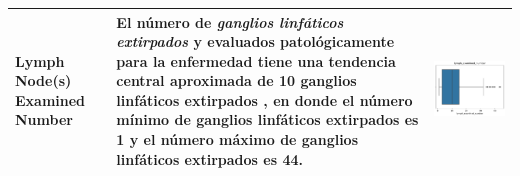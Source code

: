 \begin{table}[!htb]
\begin{threeparttable}
\begin{tabular}{p{2.5cm} p{7cm} p{6.5cm}}
			Lymph Node(s) Examined Number
			& El número de \textit{ganglios linfáticos extirpados} y evaluados patológicamente para la enfermedad tiene una tendencia central aproximada de 10 ganglios linfáticos extirpados , en donde el número mínimo de ganglios linfáticos extirpados es 1 y el número máximo de ganglios linfáticos extirpados es 44.
			& 
			\begin{center}\includegraphics[width=1\linewidth]{NOTEBOOK/IMAGENES_DESCRIPTIVAS/31_lymph_examined_number}\end{center}
			\\ \hline
		\end{tabular}
	\end{threeparttable}
\end{table}

